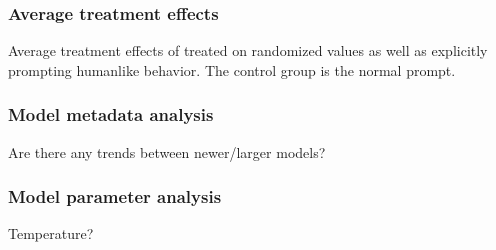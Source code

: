 \subsubsection{Average treatment effects}
Average treatment effects of treated on randomized values as well as explicitly prompting humanlike behavior. The control group is the normal prompt.

\subsubsection{Model metadata analysis}
Are there any trends between newer/larger models?

\subsubsection{Model parameter analysis}
Temperature?